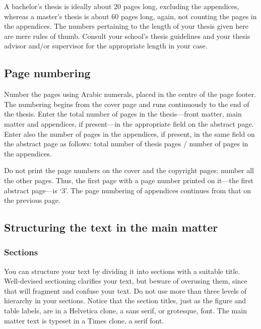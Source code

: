 \documentclass[english, 12pt, a4paper, elec, utf8, a-2b, online]{aaltothesis}
\begin{document}
A bachelor’s thesis is ideally about 20 pages long, excluding the appendices, 
whereas a master’s thesis is about 60 pages long, again, not counting the pages
in the appendices. The numbers pertaining to the length of your thesis given
here are mere rules of thumb. Consult your school’s thesis guidelines and your 
thesis advisor and/or supervisor for the appropriate length in your case.


\subsection{Page numbering}
Number the pages using Arabic numerals, placed in the centre of the page footer.
The numbering begins from the cover page and runs continuously to the end of the 
thesis. Enter the total number of pages in the thesis---front matter, main
matter and appendices, if present---in the appropriate field on the abstract
page. Enter also the number of pages in the appendices, if present, in the same 
field on the abstract page as follows: total number of thesis pages / number of 
pages in the appendices.

Do not print the page numbers on the cover and the copyright pages; number all
the other pages. Thus, the first page with a page number printed on it---the
first abstract page---is ‘3’. The page numbering of appendices continues from
that on the previous page.


\subsection{Structuring the text in the main matter}
\subsubsection{Sections}

You can structure your text by dividing it into sections with a suitable title. 
Well-devised sectioning clarifies your text, but beware of overusing them, since 
that will fragment and confuse your text. Do not use more than three levels of 
hierarchy in your sections. Notice that the section titles, just as the figure
and table labels, are in a Helvetica clone, a sans serif, or grotesque, font. 
The main matter text is typeset in a Times clone, a serif font.
\end{document}
